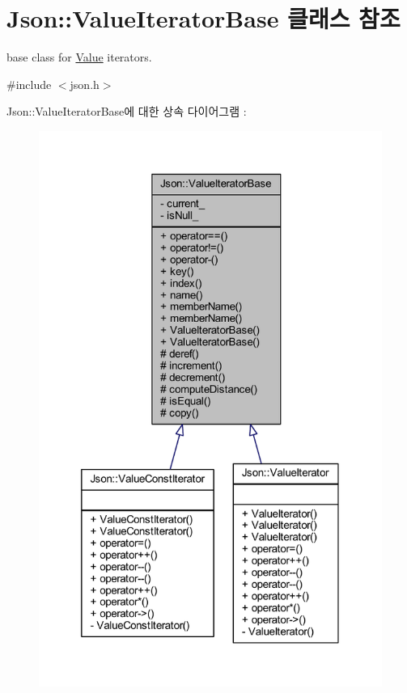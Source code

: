\hypertarget{class_json_1_1_value_iterator_base}{}\section{Json\+:\+:Value\+Iterator\+Base 클래스 참조}
\label{class_json_1_1_value_iterator_base}


base class for \hyperlink{class_json_1_1_value}{Value} iterators.  




{\ttfamily \#include $<$json.\+h$>$}



Json\+:\+:Value\+Iterator\+Base에 대한 상속 다이어그램 \+: \nopagebreak
\begin{figure}[H]
\begin{center}
\leavevmode
\includegraphics[width=320pt]{class_json_1_1_value_iterator_base__inherit__graph}
\end{center}
\end{figure}


